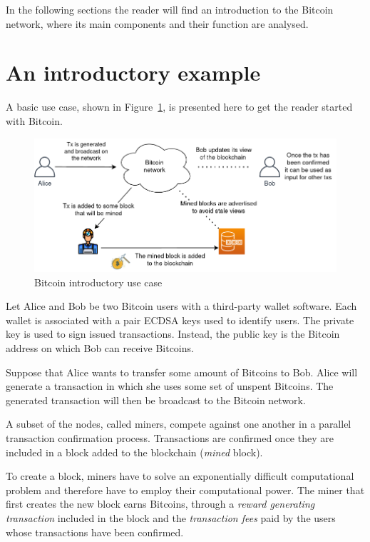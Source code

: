 In the following sections the reader will find an introduction to the Bitcoin network, where its main components and their function are analysed.


\section{An introductory example}\label{sec:useexample}
A basic use case, shown in Figure~\ref{fig:basicexample}, is presented here to get the reader started with Bitcoin.

\begin{figure}[h!]
	\includegraphics[width=.90\textwidth]{pict/basicexample.png}
	\centering
	\caption{Bitcoin introductory use case}
	\label{fig:basicexample}
\end{figure}

Let Alice and Bob be two Bitcoin users with a third-party wallet software. Each wallet is associated with a pair ECDSA keys used to identify users. The private key is used to sign issued transactions. Instead, the public key is the Bitcoin address on which Bob can receive Bitcoins.

Suppose that Alice wants to transfer some amount of Bitcoins to Bob. Alice will generate a transaction in which she uses some set of unspent Bitcoins. The generated transaction will then be broadcast to the Bitcoin network.

A subset of the nodes, called miners, compete against one another in a parallel transaction confirmation process. Transactions are confirmed once they are included in a block added to the blockchain (\emph{mined} block).

To create a block, miners have to solve an exponentially difficult computational problem and therefore have to employ their computational power. The miner that first creates the new block earns Bitcoins, through a \emph{reward generating transaction} included in the block and the \emph{transaction fees} paid by the users whose transactions have been confirmed.

